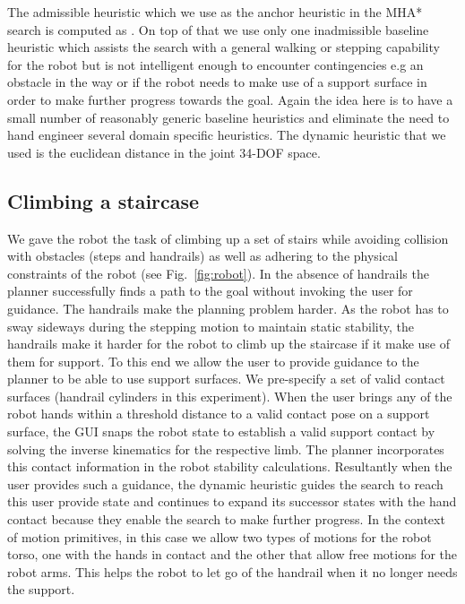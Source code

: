 \documentclass[conference]{IEEEtran}
\begin{document}

The admissible heuristic which we use as the anchor heuristic in the MHA* search is computed as . On top of that we use only one inadmissible baseline heuristic which assists the search with a general walking or stepping capability for the robot but is not intelligent enough to encounter contingencies e.g an obstacle in the way or if the robot needs to make use of a support surface in order to make further progress towards the goal. Again the idea here is to have a small number of reasonably generic baseline heuristics and eliminate the need to hand engineer several domain specific heuristics. The dynamic heuristic that we used is the euclidean distance in the joint 34-DOF space.

\subsection{Climbing a staircase}

We gave the robot the task of climbing up a set of stairs while avoiding collision with obstacles (steps and handrails) as well as adhering to the physical constraints of the robot (see Fig.~\ref{fig:robot}). In the absence of handrails the planner successfully finds a path to the goal without invoking the user for guidance. The handrails make the planning problem  harder. As the robot has to sway sideways during the stepping motion to maintain static stability, the handrails make it harder for the robot to climb up the staircase if it make use of them for support. To this end we allow the user to provide guidance to the planner to be able to use support surfaces. We pre-specify a set of valid contact surfaces (handrail cylinders in this experiment). When the user brings any of the robot hands within a threshold distance to a valid contact pose on a support surface, the GUI snaps the robot state to establish a valid support contact by solving the inverse kinematics for the respective limb. The planner incorporates this contact information in the robot stability calculations. Resultantly when the user provides such a guidance, the dynamic heuristic guides the search to reach this user provide state and continues to expand its successor states with the hand contact because they enable the search to make further progress. In the context of motion primitives, in this case we allow two types of motions for the robot torso, one with the hands in contact and the other that allow free motions for the robot arms. This helps the robot to let go of the handrail when it no longer needs the support.
\end{document}
